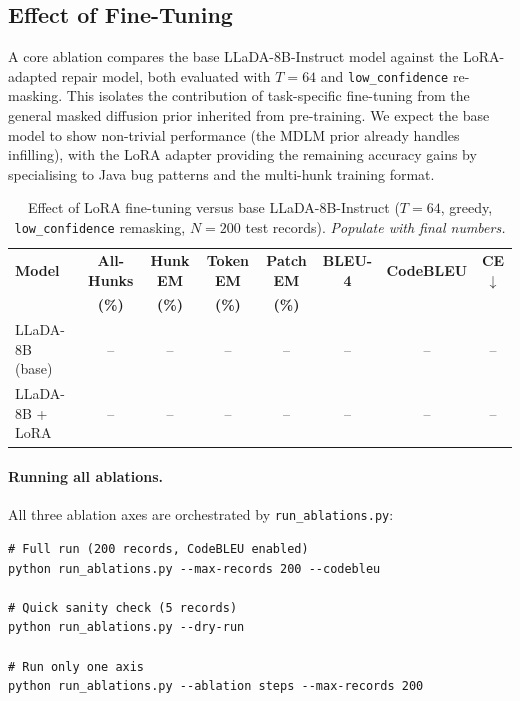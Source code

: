\documentclass[11pt,a4paper]{article}
\begin{document}
\subsection{Effect of Fine-Tuning}
\label{sec:abl_finetune}

A core ablation compares the base LLaDA-8B-Instruct model against the
LoRA-adapted repair model, both evaluated with \(T=64\) and
\texttt{low\_confidence} re-masking. This isolates the contribution of
task-specific fine-tuning from the general masked diffusion prior inherited
from pre-training. We expect the base model to show non-trivial performance
(the MDLM prior already handles infilling), with the LoRA adapter providing
the remaining accuracy gains by specialising to Java bug patterns and the
multi-hunk training format.

\begin{table}[H]
\centering
\caption{Effect of LoRA fine-tuning versus base LLaDA-8B-Instruct
($T=64$, greedy, \texttt{low\_confidence} remasking, $N=200$ test records).
\textit{Populate with final numbers.}}
\label{tab:ablation_finetune}
\renewcommand{\arraystretch}{1.15}
\begin{tabular}{lccccccc}
\toprule
\textbf{Model} & \textbf{All-Hunks} & \textbf{Hunk EM} & \textbf{Token EM}
  & \textbf{Patch EM} & \textbf{BLEU-4} & \textbf{CodeBLEU} & \textbf{CE}$\downarrow$ \\
 & \textbf{(\%)} & \textbf{(\%)} & \textbf{(\%)} & \textbf{(\%)} & & & \\
\midrule
LLaDA-8B (base)  & -- & -- & -- & -- & -- & -- & -- \\
LLaDA-8B + LoRA  & -- & -- & -- & -- & -- & -- & -- \\
\bottomrule
\end{tabular}
\end{table}

\paragraph{Running all ablations.}
All three ablation axes are orchestrated by \texttt{run\_ablations.py}:

\begin{lstlisting}[style=python, caption={Running the full ablation suite locally.}]
# Full run (200 records, CodeBLEU enabled)
python run_ablations.py --max-records 200 --codebleu

# Quick sanity check (5 records)
python run_ablations.py --dry-run

# Run only one axis
python run_ablations.py --ablation steps --max-records 200
\end{lstlisting}
\end{document}
